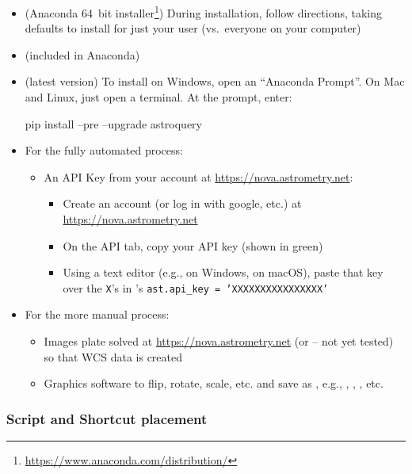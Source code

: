 \begin{itemize}
\item {} (Anaconda 64~bit
  installer\footnote{\url{https://www.anaconda.com/distribution/}}) During
  installation, follow directions, taking defaults to install for
  just your user (vs.\ everyone on your computer)
\item {} (included in Anaconda)
\item {} (latest version) To install on Windows,
  open an ``Anaconda Prompt''. On Mac and Linux, just open a
  terminal. At the prompt, enter:
  \begin{commands}
    pip install --pre --upgrade astroquery
  \end{commands}
\item For the fully automated process:
  \begin{itemize}
  \item An API Key from your account at \url{https://nova.astrometry.net}:
    \begin{itemize}
    \item Create an account (or log in with google, etc.) at \url{https://nova.astrometry.net}
    \item On the API tab, copy your API key (shown in green)
    \item Using a text editor (e.g.,  on Windows,
       on macOS), paste that key over the \texttt{X}'s
      in 's
      \texttt{ast.api\_key = 'XXXXXXXXXXXXXXXX'}
    \end{itemize}
  \end{itemize}
\item For the more manual process: 
  \begin{itemize}
  \item Images plate solved at \url{https://nova.astrometry.net} (or  -- not yet tested) so that WCS data is created
  \item Graphics software to flip, rotate, scale, etc. and save as , e.g., , , , etc.
  \end{itemize}
\end{itemize}

\subsubsection{Script and Shortcut placement}

